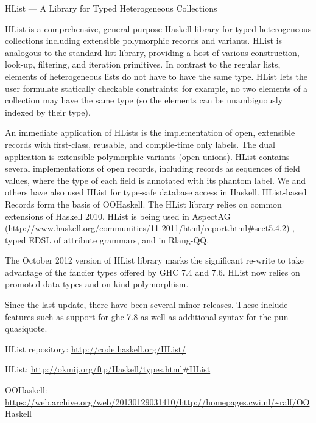 \begin{hcarentry}[updated]{HList --- A Library for Typed Heterogeneous Collections}
\label{hlist}
\makeheader

HList is a comprehensive, general purpose Haskell library for typed
heterogeneous collections including extensible polymorphic records and
variants. HList is analogous to the standard list
library, providing a host of various construction, look-up, filtering,
and iteration primitives. In contrast to the regular lists, elements
of heterogeneous lists do not have to have the same type. HList lets
the user formulate statically checkable constraints: for example, no
two elements of a collection may have the same type (so the elements
can be unambiguously indexed by their type).

An immediate application of HLists is the implementation of open,
extensible records with first-class, reusable, and compile-time only
labels. The dual application is extensible polymorphic variants (open
unions). HList contains several implementations of open records,
including records as sequences of field values, where the type of each
field is annotated with its phantom label.  We and others have also used
HList for type-safe database access in Haskell. HList-based Records
form the basis of OOHaskell. The HList library relies on common
extensions of Haskell 2010. HList is being used in AspectAG (\url{http://www.haskell.org/communities/11-2011/html/report.html#sect5.4.2})%
, typed EDSL of attribute grammars, and in Rlang-QQ.

The October 2012 version of HList library marks the significant
re-write to take advantage of the fancier types offered by GHC 7.4 and
7.6. HList now relies on promoted data types and on kind polymorphism.

Since the last update, there have been several minor releases. These include
features such as support for ghc-7.8 as well as additional syntax for the pun
quasiquote.

\FurtherReading
\begin{compactitem}
\item HList repository:
  \url{http://code.haskell.org/HList/}
\item HList:
  \url{http://okmij.org/ftp/Haskell/types.html#HList}
\item OOHaskell:
  \url{https://web.archive.org/web/20130129031410/http://homepages.cwi.nl/~ralf/OOHaskell}
\end{compactitem}
\end{hcarentry}
